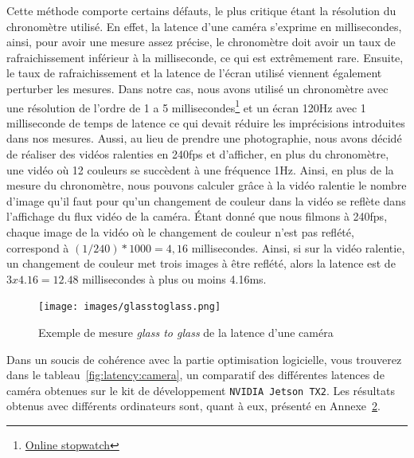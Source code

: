 Cette méthode comporte certains défauts, le plus critique étant la résolution du chronomètre utilisé. En effet, la latence d'une caméra s'exprime en millisecondes, ainsi, pour avoir une mesure assez précise, le chronomètre doit avoir un taux de rafraichissement inférieur à la milliseconde, ce qui est extrêmement rare. Ensuite, le taux de rafraichissement et la latence de l'écran utilisé viennent également perturber les mesures. Dans notre cas, nous avons utilisé un chronomètre avec une résolution de l'ordre de 1 a 5 millisecondes\footnote{\href{https://stopwatch.onlineclock.net/}{Online stopwatch}} et un écran 120Hz avec 1 milliseconde de temps de latence ce qui devait réduire les imprécisions introduites dans nos mesures. Aussi, au lieu de prendre une photographie, nous avons décidé de réaliser des vidéos ralenties en 240fps et d'afficher, en plus du chronomètre, une vidéo où 12 couleurs se succèdent à une fréquence 1Hz. Ainsi, en plus de la mesure du chronomètre, nous pouvons calculer grâce à la vidéo ralentie le nombre d'image qu'il faut pour qu'un changement de couleur dans la vidéo se reflète dans l'affichage du flux vidéo de la caméra. Étant donné que nous filmons à 240fps, chaque image de la vidéo où le changement de couleur n'est pas reflété, correspond à $(1/240) * 1000 = 4,16$ millisecondes. Ainsi, si sur la vidéo ralentie, un changement de couleur met trois images à être reflété, alors la latence est de $3 x 4.16 = 12.48$ millisecondes à plus ou moins 4.16ms.

\begin{figure}[H]
\centering
\texttt{[image: images/glasstoglass.png]}
\caption{Exemple de mesure \emph{glass to glass} de la latence d'une caméra}
\label{fig:latency:glasstoglass}
\end{figure}

Dans un soucis de cohérence avec la partie optimisation logicielle, vous trouverez dans le tableau~\ref{fig:latency:camera}, un comparatif des différentes latences de caméra obtenues sur le kit de développement \texttt{NVIDIA Jetson TX2}. Les résultats obtenus avec différents ordinateurs sont, quant à eux, présenté en Annexe~\hyperref[annexe:camera]{2}.

\begin{table}[H]
\centering
\caption{Latence (en ms) de plusieurs caméras mesurée en \emph{glass to glass} - \texttt{NVIDIA Jetson TX2}}
\label{fig:latency:camera}
\end{table}

